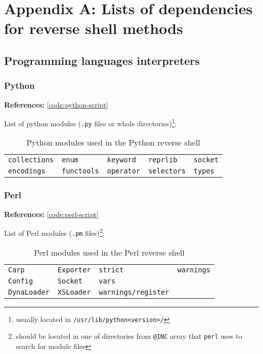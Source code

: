 \newcommand{\references}[1]{\noindent \textbf{References:} \cref{#1}}

\renewcommand{\tablename}{List}
\setlength{\tabcolsep}{15pt}


\chapter*{Appendix A: Lists of dependencies for reverse shell methods}

\section*{Programming languages interpreters}

\subsection*{Python}

\references{code:python-script}

List of python modules (\texttt{.py} files or whole directories)\footnote{usually located in \texttt{/usr/lib/python<version>/}}:

\begin{longtable}{l l l l l}
\caption{Python modules used in the Python reverse shell}\label{tab:python-dpd} \\
\texttt{collections} & \texttt{enum} & \texttt{keyword} & \texttt{reprlib} & \texttt{socket} \\
\texttt{encodings} & \texttt{functools} & \texttt{operator} & \texttt{selectors} & \texttt{types} \\
\end{longtable}


\subsection*{Perl}

\references{code:perl-script}

List of Perl modules (\texttt{.pm} files)\footnote{should be located in one of directories from \texttt{@INC} array that \texttt{perl} uses to search for module files}:

\begin{longtable}{l l l l}
\caption{Perl modules used in the Perl reverse shell}\label{tab:perl-dpd} \\
\texttt{Carp} & \texttt{Exporter} & \texttt{strict} & \texttt{warnings} \\
\texttt{Config} & \texttt{Socket} & \texttt{vars} \\
\texttt{DynaLoader} & \texttt{XSLoader} & \texttt{warnings/register} \\
\end{longtable}


